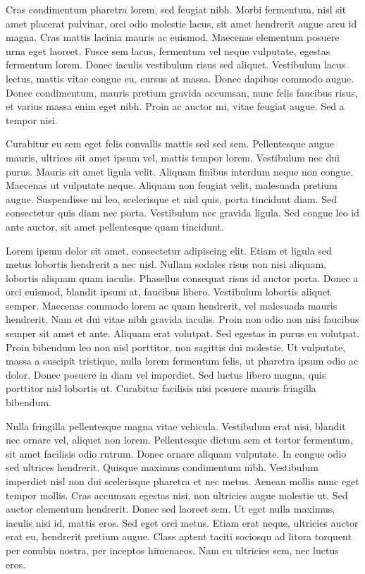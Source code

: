 \documentclass[11pt,twoside]{article}
\begin{document}
Cras condimentum pharetra lorem, sed feugiat nibh. Morbi fermentum, nisl sit amet placerat pulvinar, orci odio molestie lacus, sit amet hendrerit augue arcu id magna. Cras mattis lacinia mauris ac euismod. Maecenas elementum posuere urna eget laoreet. Fusce sem lacus, fermentum vel neque vulputate, egestas fermentum lorem. Donec iaculis vestibulum risus sed aliquet. Vestibulum lacus lectus, mattis vitae congue eu, cursus at massa. Donec dapibus commodo augue. Donec condimentum, mauris pretium gravida accumsan, nunc felis faucibus risus, et varius massa enim eget nibh. Proin ac auctor mi, vitae feugiat augue. Sed a tempor nisi.

Curabitur eu sem eget felis convallis mattis sed sed sem. Pellentesque augue mauris, ultrices sit amet ipsum vel, mattis tempor lorem. Vestibulum nec dui purus. Mauris sit amet ligula velit. Aliquam finibus interdum neque non congue. Maecenas ut vulputate neque. Aliquam non feugiat velit, malesuada pretium augue. Suspendisse mi leo, scelerisque et nisl quis, porta tincidunt diam. Sed consectetur quis diam nec porta. Vestibulum nec gravida ligula. Sed congue leo id ante auctor, sit amet pellentesque quam tincidunt. 



Lorem ipsum dolor sit amet, consectetur adipiscing elit. Etiam et ligula sed metus lobortis hendrerit a nec nisl. Nullam sodales risus non nisi aliquam, lobortis aliquam quam iaculis. Phasellus consequat risus id auctor porta. Donec a orci euismod, blandit ipsum at, faucibus libero. Vestibulum lobortis aliquet semper. Maecenas commodo lorem ac quam hendrerit, vel malesuada mauris hendrerit. Nam et dui vitae nibh gravida iaculis. Proin non odio non nisi faucibus semper sit amet et ante. Aliquam erat volutpat. Sed egestas in purus eu volutpat. Proin bibendum leo non nisl porttitor, non sagittis dui molestie. Ut vulputate, massa a suscipit tristique, nulla lorem fermentum felis, ut pharetra ipsum odio ac dolor. Donec posuere in diam vel imperdiet. Sed luctus libero magna, quis porttitor nisl lobortis ut. Curabitur facilisis nisi posuere mauris fringilla bibendum.

Nulla fringilla pellentesque magna vitae vehicula. Vestibulum erat nisi, blandit nec ornare vel, aliquet non lorem. Pellentesque dictum sem et tortor fermentum, sit amet facilisis odio rutrum. Donec ornare aliquam vulputate. In congue odio sed ultrices hendrerit. Quisque maximus condimentum nibh. Vestibulum imperdiet nisl non dui scelerisque pharetra et nec metus. Aenean mollis nunc eget tempor mollis. Cras accumsan egestas nisi, non ultricies augue molestie ut. Sed auctor elementum hendrerit. Donec sed laoreet sem. Ut eget nulla maximus, iaculis nisi id, mattis eros. Sed eget orci metus. Etiam erat neque, ultricies auctor erat eu, hendrerit pretium augue. Class aptent taciti sociosqu ad litora torquent per conubia nostra, per inceptos himenaeos. Nam eu ultricies sem, nec luctus eros.
\end{document}
